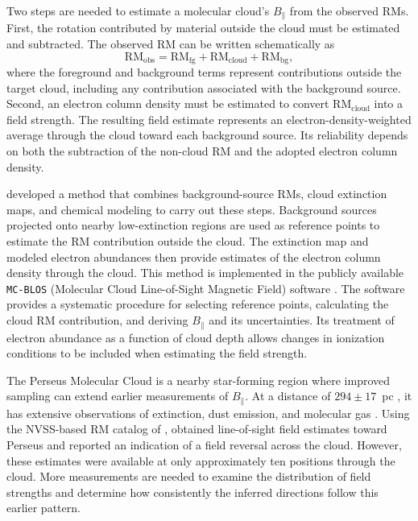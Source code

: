 \documentclass[twocolumn]{aastex701}
\begin{document}
Two steps are needed to estimate a molecular cloud's $B_\parallel$ from the observed RMs. First, the rotation contributed by material outside the cloud must be estimated and subtracted. The observed RM can be written schematically as
\begin{equation}
\label{eq:rm-split}
\mathrm{RM_{obs}} =
\mathrm{RM_{fg}}+\mathrm{RM_{cloud}}+\mathrm{RM_{bg}},
\end{equation}
where the foreground and background terms represent contributions outside the target cloud, including any contribution associated with the background source. Second, an electron column density must be estimated to convert $\mathrm{RM_{cloud}}$ into a field strength. The resulting field estimate represents an electron-density-weighted average through the cloud toward each background source. Its reliability depends on both the subtraction of the non-cloud RM and the adopted electron column density.

\citet{tahani2018} developed a method that combines background-source RMs, cloud extinction maps, and chemical modeling to carry out these steps. Background sources projected onto nearby low-extinction regions are used as reference points to estimate the RM contribution outside the cloud. The extinction map and modeled electron abundances then provide estimates of the electron column density through the cloud. This method is implemented in the publicly available \texttt{MC-BLOS} (Molecular Cloud Line-of-Sight Magnetic Field) software \citep{tahani2025mcblos}. The software provides a systematic procedure for selecting reference points, calculating the cloud RM contribution, and deriving $B_\parallel$ and its uncertainties. Its treatment of electron abundance as a function of cloud depth allows changes in ionization conditions to be included when estimating the field strength.

The Perseus Molecular Cloud is a nearby star-forming region where improved sampling can extend earlier measurements of $B_\parallel$. At a distance of $294\pm17$~pc \citep{zucker2018}, it has extensive observations of extinction, dust emission, and molecular gas \citep{ridge2006complete,kainulainen2009,lombardi2009nicest,andre2010,curtis2010submillimetre}. Using the NVSS-based RM catalog of \citet{taylor2009}, \citet{tahani2018} obtained line-of-sight field estimates toward Perseus and reported an indication of a field reversal across the cloud. However, these estimates were available at only approximately ten positions through the cloud. More measurements are needed to examine the distribution of field strengths and determine how consistently the inferred directions follow this earlier pattern.
\end{document}
